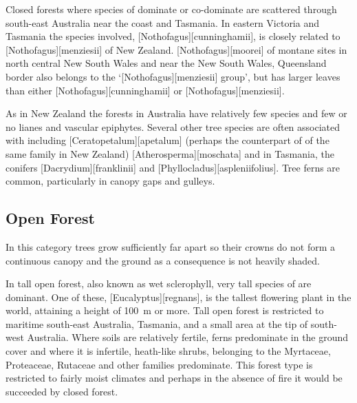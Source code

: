 Closed forests where species of  dominate or co-dominate are scattered through south-east Australia near the coast and Tasmania.
In eastern Victoria and Tasmania the species involved, [Nothofagus][cunninghamii], is closely related to [Nothofagus][menziesii] of New Zealand. [Nothofagus][moorei] of montane sites in north central New South Wales and near the New South Wales, Queensland border also belongs to the `[Nothofagus][menziesii] group', but has larger leaves than either [Nothofagus][cunninghamii] or [Nothofagus][menziesii].

As in New Zealand the  forests in Australia have relatively few species and few or no lianes and vascular epiphytes.
Several other tree species are often associated with  including [Ceratopetalum][apetalum] (perhaps the counterpart of  of the same family in New Zealand) [Atherosperma][moschata] and in Tasmania, the conifers [Dacrydium][franklinii] and [Phyllocladus][aspleniifolius].
Tree ferns are common, particularly in canopy gaps and gulleys.

\subsection{Open Forest}

In this category trees grow sufficiently far apart so their crowns do not form a continuous canopy and the ground as a consequence is not heavily shaded.

In tall open forest, also known as wet sclerophyll, very tall species of  are dominant.
One of these, [Eucalyptus][regnans], is the tallest flowering plant in the world, attaining a height of \SI{100}{\metre} or more.
Tall open forest is restricted to maritime south-east Australia, Tasmania, and a small area at the tip of south-west Australia.
Where soils are relatively fertile, ferns predominate in the ground cover and where it is infertile, heath-like shrubs, belonging to the Myrtaceae, Proteaceae, Rutaceae and other families predominate.
This forest type is restricted to fairly moist climates and perhaps in the absence of fire it would be succeeded by closed forest.

